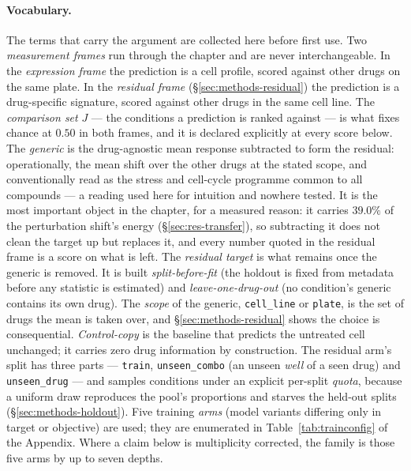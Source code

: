 \paragraph{Vocabulary.} The terms that carry the argument are collected here before first use. Two
\emph{measurement frames} run through the chapter and are never interchangeable. In the
\emph{expression frame} the prediction is a cell profile, scored against other drugs on the same
plate. In the \emph{residual frame} (\S\ref{sec:methods-residual}) the prediction is a drug-specific
signature, scored against other drugs in the same cell line. The \emph{comparison set} $J$ --- the
conditions a prediction is ranked against --- is what fixes chance at $0.50$ in both frames, and it
is declared explicitly at every score below. The \emph{generic} is the drug-agnostic mean response
subtracted to form the residual: operationally, the mean shift over the other drugs at the stated
scope, and conventionally read as the stress and cell-cycle programme common to all compounds --- a
reading used here for intuition and nowhere tested. It is the most important object in the chapter,
for a measured reason: it carries $39.0\%$ of the perturbation shift's energy
(\S\ref{sec:res-transfer}), so subtracting it does not clean the target up but replaces it, and
every number quoted in the residual frame is a score on what is left. The \emph{residual target} is what remains once the
generic is removed. It is built \emph{split-before-fit} (the holdout is fixed from metadata before
any statistic is estimated) and \emph{leave-one-drug-out} (no condition's generic contains its own
drug). The \emph{scope} of the generic, \texttt{cell\_line} or \texttt{plate}, is the set of
drugs the mean is taken over, and \S\ref{sec:methods-residual} shows the choice is consequential.
\emph{Control-copy} is the baseline that predicts the untreated cell unchanged; it carries zero drug
information by construction. The residual arm's split has three parts --- \texttt{train},
\texttt{unseen\_combo} (an unseen \emph{well} of a seen drug) and \texttt{unseen\_drug} --- and
samples conditions under an explicit per-split \emph{quota}, because a uniform draw
reproduces the pool's proportions and starves the held-out splits (\S\ref{sec:methods-holdout}).
Five training \emph{arms} (model variants differing only in target or objective) are used; they are
enumerated in Table~\ref{tab:trainconfig} of the Appendix. Where a claim below is multiplicity
corrected, the family is those five arms by up to seven depths.

